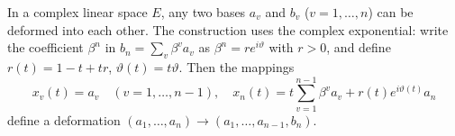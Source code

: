 In a complex linear space $E$, any two bases $a_v$ and $b_v$ ($v = 1, \ldots, n$) can be deformed into each other.
The construction uses the complex exponential: write the coefficient $\beta^n$ in $b_n = \sum_v \beta^v a_v$ as $\beta^n = r e^{i\vartheta}$ with $r > 0$, and define $r(t) = 1 - t + tr$, $\vartheta(t) = t\vartheta$. Then the mappings
$$x_v(t) = a_v \quad (v = 1, \ldots, n-1), \quad x_n(t) = t\sum_{v=1}^{n-1} \beta^v a_v + r(t) e^{i\vartheta(t)} a_n$$
define a deformation $(a_1, \ldots, a_n) \to (a_1, \ldots, a_{n-1}, b_n)$.

